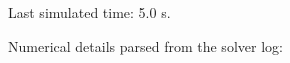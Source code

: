 \documentclass[11pt,english]{article}
\begin{document}

Last simulated time: 5.0 s.







Numerical details parsed from the solver log:
\end{document}
